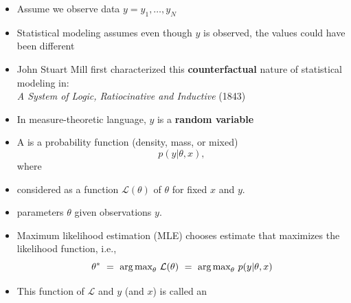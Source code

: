 \documentclass[10pt]{report}
\begin{document}


%
\begin{itemize}
\item Assume we observe data $y = y_1, \ldots, y_N$
\item Statistical modeling assumes even though $y$ is observed,
the values could have been different
\item John Stuart Mill first characterized this {\bfseries counterfactual} nature of statistical modeling in:
\\[3pt] {\slshape A System of Logic, Ratiocinative and Inductive} (1843)
\item In measure-theoretic language, $y$ is a {\bfseries random variable}
\end{itemize}


%
\begin{itemize}
\item A  is a probability function (density, mass, or mixed) 
\[
p(y|\theta,x),
\]
where
\item considered as a function $\mathcal{L}(\theta)$ of $\theta$ for fixed $x$ and $y$.
\end{itemize}


%
\begin{itemize}
\item {} parameters $\theta$ given observations $y$.
\item Maximum likelihood estimation (MLE) chooses 
estimate that maximizes the likelihood function, i.e.,
\[
\theta^* 
\ = \ \mbox{arg\,max}_{\theta} \ \mathcal{L}(\theta) 
\ = \ \mbox{arg\,max}_{\theta} \ p(y|\theta,x)
\]
\item This function of $\mathcal{L}$ and $y$ (and $x$) is called an 
\end{itemize}
\end{document}
